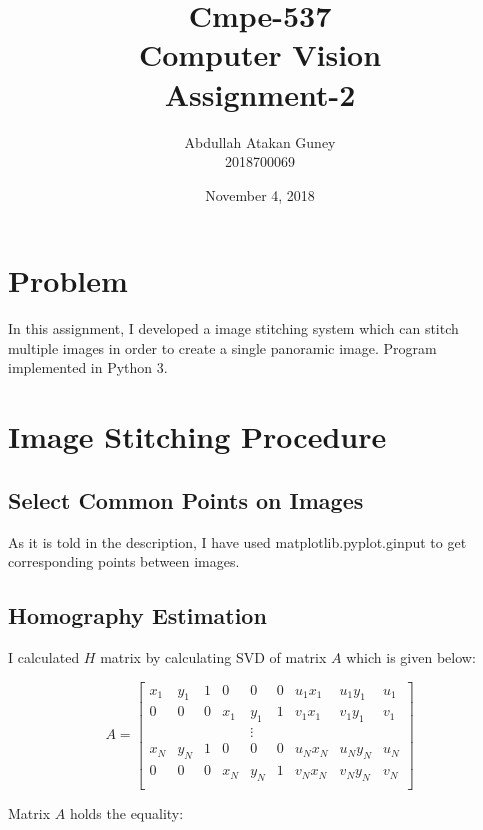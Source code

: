 \documentclass[12pt]{article}
\title{Cmpe-537 \\ Computer Vision \\ Assignment-2
}
\author{Abdullah Atakan Guney \\ 2018700069}
\date{November 4, 2018}
\begin{document}
 
\maketitle

\newpage

\tableofcontents

\newpage

\section{Problem}
In this assignment, I developed a image stitching system which can stitch multiple images in order to create a single panoramic image. Program implemented in Python 3.

\section{Image Stitching Procedure}
\subsection{Select Common Points on Images}
As it is told in the description, I have used matplotlib.pyplot.ginput to get corresponding points between images.

\subsection{Homography Estimation}
I calculated $H$ matrix by calculating SVD of matrix $A$ which is given below:

\begin{equation*}
    A = \left[ \begin{array}{ccccccccc}
         x_1 & y_1 & 1 & 0 & 0 & 0 & u_1 x_1 & u_1 y_1 & u_1  \\ 
         0 & 0 & 0 & x_1 & y_1 & 1 & v_1 x_1 & v_1 y_1 & v_1  \\
          &  &  &  & \vdots &  &  &  & \\
         x_N & y_N & 1 & 0 & 0 & 0 & u_N x_N & u_N y_N & u_N  \\ 
         0 & 0 & 0 & x_N & y_N & 1 & v_N x_N & v_N y_N & v_N  \\     
    \end{array} \right]
\end{equation*}

Matrix $A$ holds the equality:
\end{document}
